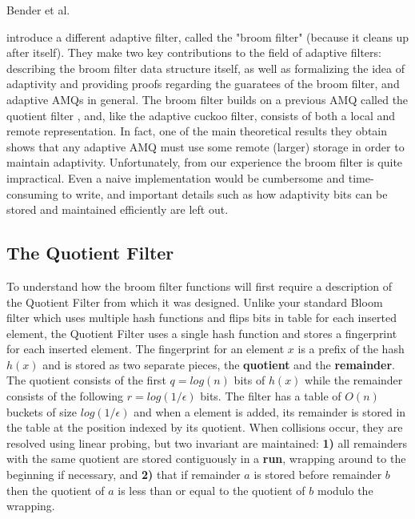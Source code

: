 \documentclass[../paper.tex]{subfiles}
\begin{document}
 Bender et al.

\cite{broom-filter} introduce a different adaptive filter, called the "broom filter"
(because it cleans up after itself). They make two key contributions to the
field of adaptive filters: describing the broom filter data structure itself,
as well as formalizing the idea of adaptivity and providing proofs regarding the guaratees
of the broom filter, and adaptive AMQs in general. The broom filter builds on
a previous AMQ called the quotient filter \cite{quotient-filter}, and, like the adaptive
cuckoo filter, consists of both a local and remote representation. In fact, one
of the main theoretical results they obtain shows that any adaptive AMQ must use
some remote (larger) storage in order to maintain adaptivity. Unfortunately, from
our experience the broom filter is quite impractical. Even a naive implementation
would be cumbersome and time-consuming to write, and important details such as
how adaptivity bits can be stored and maintained efficiently are left out.

\subsection{The Quotient Filter} To understand how the broom filter functions
will first require a description of the Quotient Filter from which it was
designed.   Unlike your standard Bloom filter which uses multiple hash
functions and flips bits in table for each inserted element, the Quotient
Filter uses a single hash function and stores a fingerprint for each inserted
element.  The fingerprint for an element $x$ is a prefix of the hash $h(x)$ and
is stored as two separate pieces, the {\bf quotient} and the {\bf remainder}.
The quotient consists of the first $q = log(n)$ bits of $h(x)$ while the
remainder consists of the following $r = log(1/\epsilon)$ bits.  The filter has
a table of $O(n)$ buckets of size $log(1/\epsilon)$ and when a element is
added, its remainder is stored in the table at the position indexed by its
quotient.  When collisions occur, they are resolved using linear probing, but
two invariant are maintained: {\bf 1)} all remainders with the same quotient
are stored contiguously in a {\bf run}, wrapping around to the beginning if
necessary, and {\bf 2)} that if remainder $a$ is stored before remainder $b$
then the quotient of $a$ is less than or equal to the quotient of $b$ modulo
the wrapping.  
\end{document}
